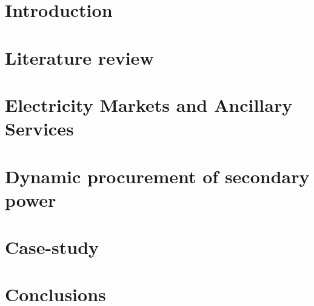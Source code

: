 \documentclass[journal,article,submit,pdftex,moreauthors]{Definitions/mdpi}
\begin{document}
\section{Introduction}

\label{introduction}

\section{Literature review}

\label{literary_review}

\section{Electricity Markets and Ancillary Services}

\label{markets_and_services}

\section{Dynamic procurement of secondary power}

\label{procument}

\section{Case-study}

\label{case_study}

\section{Conclusions}

\label{conclusion}







\end{document}

